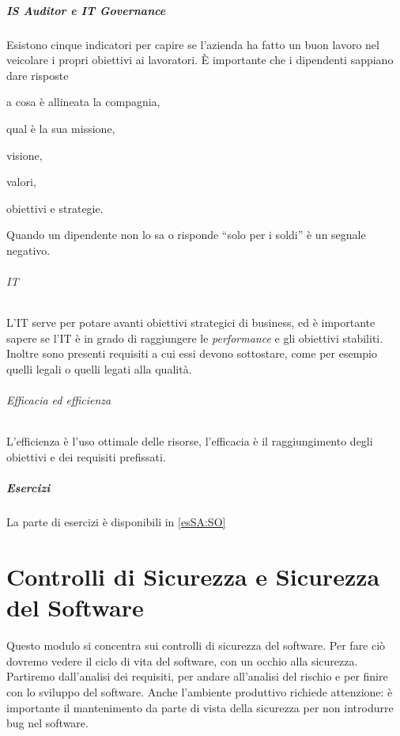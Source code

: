 \subsubsection{IS Auditor e IT Governance}

Esistono cinque indicatori per capire se l'azienda ha fatto un buon lavoro nel
veicolare i propri obiettivi ai lavoratori. È importante che i dipendenti
sappiano dare risposte
\begin{enumerate*}[label=\arabic*)]
\item a cosa è allineata la compagnia,
\item qual è la sua missione,
\item visione,
\item valori,
\item obiettivi e strategie.
\end{enumerate*}

Quando un dipendente non lo sa o
risponde ``solo per i soldi'' è un segnale negativo.

\paragraph*{IT} L'IT serve per potare avanti obiettivi strategici di business,
ed è importante sapere se l'IT è in grado di raggiungere le \textit{performance}
e gli obiettivi stabiliti. Inoltre sono presenti requisiti a cui essi devono
sottostare, come per esempio quelli legali o quelli legati alla qualità.

\paragraph*{Efficacia ed efficienza} L'efficienza è l'uso ottimale delle
risorse, l'efficacia è il raggiungimento degli obiettivi e dei requisiti
prefissati.


\subsubsection{Esercizi}

La parte di esercizi è disponibili in \ref{esSA:SO}

\part{Controlli di Sicurezza e Sicurezza del Software}

Questo modulo si concentra sui controlli di sicurezza del software. Per fare ciò
dovremo vedere il ciclo di vita del software, con un occhio alla sicurezza.
Partiremo dall'analisi dei requisiti, per andare all'analisi del rischio e per
finire con lo sviluppo del software.
Anche l'ambiente produttivo richiede attenzione: è importante il mantenimento da
parte di vista della sicurezza per non introdurre bug nel software.

